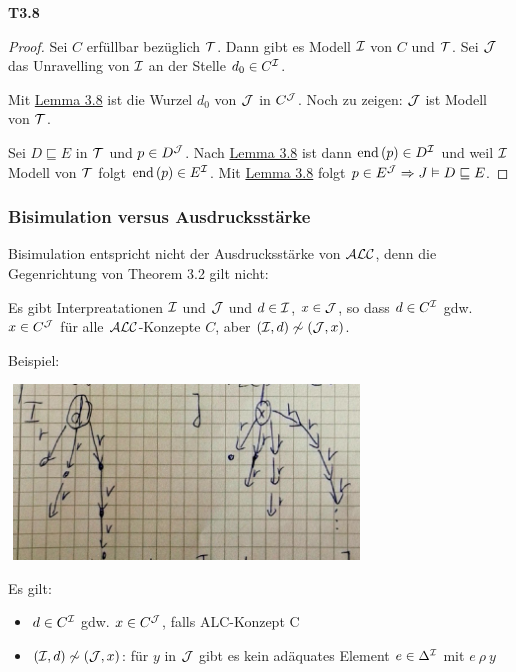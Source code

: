 \textbf{T3.8}
\begin{proof}
Sei $C$ erfüllbar bezüglich $\mathcal{T}$. Dann gibt es Modell $\mathcal{I}$ von $C$ und $\mathcal{T}$. Sei $\mathcal{J}$ das Unravelling von $\mathcal{I}$ an der Stelle
$d_0 \in C^{\mathcal{I}}$.

Mit \hyperlink{lemma37}{Lemma 3.8} ist die Wurzel $d_0$ von $\mathcal{J}$ in $C^{\mathcal{J}}$. Noch zu zeigen: $\mathcal{J}$ ist Modell von $\mathcal{T}$. 

Sei $D \sqsubseteq E$ in $\mathcal{T}$ und $p \in D^{\mathcal{J}}$. Nach \protect\hyperlink{lemma37}{Lemma 3.8} ist dann $\text{end}\left( p \right) \in D^{\mathcal{I}}$ und weil $\mathcal{I}$ Modell von $\mathcal{T}$ folgt $\text{end}\left( p \right) \in E^{\mathcal{I}}$. Mit \protect\hyperlink{lemma37}{Lemma 3.8} folgt $p \in E^{\mathcal{J}} \Rightarrow J \vDash D \sqsubseteq E$.
\end{proof}

\subsubsection{Bisimulation versus Ausdrucksstärke}\label{bisimulation-versus-ausdrucksstuxe4rke}

Bisimulation entspricht nicht der Ausdrucksstärke von $\mathcal{A}\mathcal{L}\mathcal{C}$, denn die Gegenrichtung von Theorem 3.2 gilt nicht:

Es gibt Interpreatationen $\mathcal{I}$ und $\mathcal{J}$ und $d \in \mathcal{I}$, $x \in \mathcal{J}$, so dass $d \in C^{\mathcal{I}}$ gdw. $x \in C^{\mathcal{J}}$ für alle $\mathcal{A}\mathcal{L}\mathcal{C}$-Konzepte $C$, aber $(\mathcal{I},d) \not\sim (\mathcal{J},x)$. 

Beispiel:

\includegraphics[width=3.71910in,height=1.83200in]{media/39bis.png}

Es gilt:

\begin{itemize}
  \item $d \in C^{\mathcal{I}}$ gdw. $x \in C^{\mathcal{J}}$, falls ALC-Konzept C
  \item $(\mathcal{I},d) \not\sim (\mathcal{J},x)$: für $y$ in $\mathcal{J}$ gibt es kein adäquates Element $e \in \Delta^{\mathcal{I}}$ mit $e\ \rho\ y$
\end{itemize}

